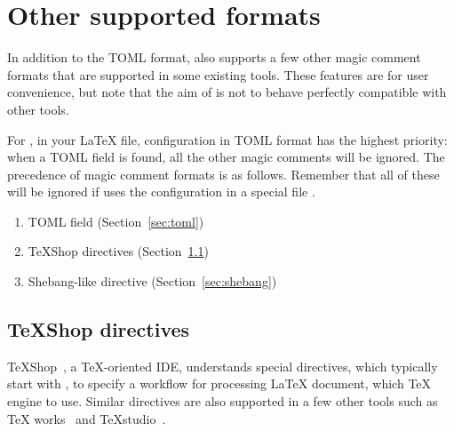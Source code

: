 \documentclass[draft]{llmk-doc}
\begin{document}
\section{Other supported formats}
\label{sec:magic-comment}

In addition to the TOML format,  also supports a few other magic
comment formats that are supported in some existing tools. These features are
for user convenience, but note that the aim of  is not to behave
perfectly compatible with other tools.

For , in your {\LaTeX} file, configuration in TOML format has the
highest priority: when a TOML field is found, all the other magic comments will
be ignored. The precedence of magic comment formats is as follows. Remember
that all of these will be ignored if  uses the configuration in a
special file .
%
\begin{enumerate}
\item TOML field (Section~\ref{sec:toml})
\item {\TeX}Shop directives (Section~\ref{sec:ts-directive})
\item Shebang-like directive (Section~\ref{sec:shebang})
\end{enumerate}

\subsection{{\TeX}Shop directives}
\label{sec:ts-directive}

{\TeX}Shop~\cite{texshop}, a {\TeX}-oriented IDE, understands special
directives, which typically start with , to
specify a workflow for processing {\LaTeX} document, \eg which {\TeX} engine to
use. Similar directives are also supported in a few other tools such as {\TeX}%
works~\cite{texworks} and {\TeX}studio~\cite{texstudio}.
\end{document}
